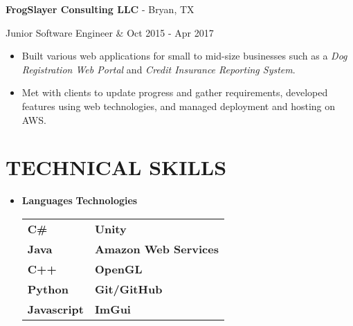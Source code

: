 \documentclass[resmargin,10pt]{res} %
\begin{document}
\begin{resume}
\begin{itemize}
                \end{itemize}
				{\bf FrogSlayer Consulting LLC} - Bryan, TX \\ 
                \begin{ncolumn}{2} %
                Junior Software Engineer &  \hfill Oct 2015 - Apr 2017
                \end{ncolumn}
                \begin{itemize}           
                \item  Built various web applications for small to mid-size businesses such as a \textit{Dog Registration Web Portal} and \textit{Credit Insurance Reporting System}.
                \item Met with clients to update progress and gather requirements, developed features using web technologies, and managed deployment and hosting on AWS.
                \end{itemize}
                    
\section{TECHNICAL SKILLS}	
							\begin{itemize}
                    		\item[] 
\textbf{\large Languages}  \hspace*{.5in} \textbf{\large Technologies}        \\
\begin{tabular}{ll}
\textbf{C\#} \hspace*{1in}  & \textbf{Unity} \\
\textbf{Java} & \textbf{Amazon Web Services} \\
\textbf{C++}   & \textbf{OpenGL}       \\
\textbf{Python}  & \textbf{Git/GitHub}               \\
\textbf{Javascript} & \textbf{ImGui}               \\
\end{tabular}
                    		\end{itemize} 

\end{resume}
\end{document}
